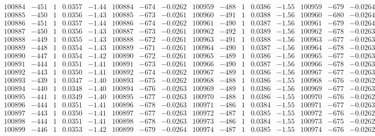 \documentclass[11pt,reqno,a4letter]{article}
\numberwithin{figure}{section}
\numberwithin{table}{section}
\theoremstyle{plain}
\numberwithin{theorem}{section}
\theoremstyle{definition}
\begin{document}
\begin{table}[ht!]
\begin{equation*}
{\begin{array}{ccccc|ccc||ccccc|ccc}
100884 & -451 & 1 & 0.0357 & -1.44 & 100884 & -674 & -0.0262 & 100959 & -488 & 1 & 0.0386 & -1.55 & 100959 & -679 & -0.0264  \\
100885 & -450 & 1 & 0.0356 & -1.43 & 100885 & -673 & -0.0261 & 100960 & -491 & 1 & 0.0388 & -1.56 & 100960 & -680 & -0.0264  \\
100886 & -451 & 1 & 0.0357 & -1.44 & 100886 & -674 & -0.0262 & 100961 & -490 & 1 & 0.0387 & -1.56 & 100961 & -679 & -0.0264  \\
100887 & -450 & 1 & 0.0356 & -1.43 & 100887 & -673 & -0.0261 & 100962 & -492 & 1 & 0.0389 & -1.56 & 100962 & -678 & -0.0263  \\
100888 & -449 & 1 & 0.0355 & -1.43 & 100888 & -672 & -0.0261 & 100963 & -491 & 1 & 0.0388 & -1.56 & 100963 & -677 & -0.0263  \\
100889 & -448 & 1 & 0.0354 & -1.43 & 100889 & -671 & -0.0261 & 100964 & -490 & 1 & 0.0387 & -1.56 & 100964 & -678 & -0.0263  \\
100890 & -447 & 1 & 0.0354 & -1.42 & 100890 & -672 & -0.0261 & 100965 & -489 & 1 & 0.0386 & -1.56 & 100965 & -677 & -0.0263  \\
100891 & -444 & 1 & 0.0351 & -1.41 & 100891 & -673 & -0.0261 & 100966 & -490 & 1 & 0.0387 & -1.56 & 100966 & -678 & -0.0263  \\
100892 & -443 & 1 & 0.0350 & -1.41 & 100892 & -674 & -0.0262 & 100967 & -489 & 1 & 0.0386 & -1.56 & 100967 & -677 & -0.0263  \\
100893 & -439 & 1 & 0.0347 & -1.40 & 100893 & -675 & -0.0262 & 100968 & -488 & 1 & 0.0386 & -1.55 & 100968 & -676 & -0.0262  \\
100894 & -440 & 1 & 0.0348 & -1.40 & 100894 & -676 & -0.0263 & 100969 & -489 & 1 & 0.0386 & -1.56 & 100969 & -677 & -0.0263  \\
100895 & -441 & 1 & 0.0349 & -1.40 & 100895 & -677 & -0.0263 & 100970 & -488 & 1 & 0.0386 & -1.55 & 100970 & -676 & -0.0262  \\
100896 & -444 & 1 & 0.0351 & -1.41 & 100896 & -678 & -0.0263 & 100971 & -486 & 1 & 0.0384 & -1.55 & 100971 & -677 & -0.0263  \\
100897 & -443 & 1 & 0.0350 & -1.41 & 100897 & -677 & -0.0263 & 100972 & -487 & 1 & 0.0385 & -1.55 & 100972 & -676 & -0.0262  \\
100898 & -444 & 1 & 0.0351 & -1.41 & 100898 & -678 & -0.0263 & 100973 & -486 & 1 & 0.0384 & -1.55 & 100973 & -675 & -0.0262  \\
100899 & -446 & 1 & 0.0353 & -1.42 & 100899 & -679 & -0.0264 & 100974 & -487 & 1 & 0.0385 & -1.55 & 100974 & -676 & -0.0262  \\

\end{array}}
\end{equation*}
\end{table}
\end{document}
